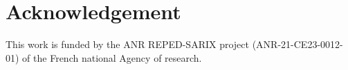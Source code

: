 \vspace{-5pt} 
\section{Acknowledgement}
\vspace{-5pt} 
This work is funded by the ANR REPED-SARIX project (ANR-21-CE23-0012-01) of the French national Agency of research.

